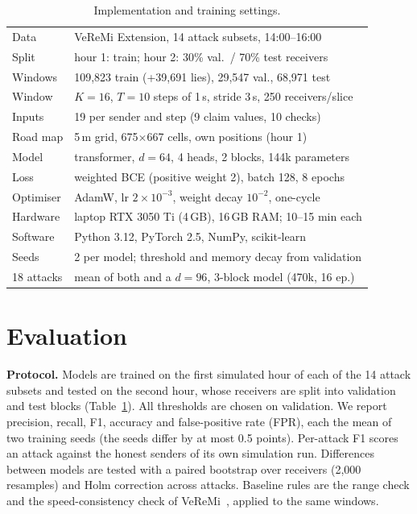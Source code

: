 \documentclass[conference]{IEEEtran}
\begin{document}
\begin{table}[t]\centering
\caption{Implementation and training settings.}\label{tab:impl}\scriptsize\setlength{\tabcolsep}{3pt}
\begin{tabular}{@{}ll@{}}\toprule
Data & VeReMi Extension, 14 attack subsets, 14:00--16:00 \\
Split & hour 1: train; hour 2: 30\% val.\ / 70\% test receivers \\
Windows & 109,823 train (+39,691 lies), 29,547 val., 68,971 test \\
Window & $K{=}16$, $T{=}10$ steps of 1\,s, stride 3\,s, 250 receivers/slice \\
Inputs & 19 per sender and step (9 claim values, 10 checks) \\
Road map & 5\,m grid, 675$\times$667 cells, own positions (hour 1) \\
Model & transformer, $d{=}64$, 4 heads, 2 blocks, 144k parameters \\
Loss & weighted BCE (positive weight 2), batch 128, 8 epochs \\
Optimiser & AdamW, lr $2{\times}10^{-3}$, weight decay $10^{-2}$, one-cycle \\
Hardware & laptop RTX 3050 Ti (4\,GB), 16\,GB RAM; 10--15 min each \\
Software & Python 3.12, PyTorch 2.5, NumPy, scikit-learn \\
Seeds & 2 per model; threshold and memory decay from validation \\
18 attacks & mean of both and a $d{=}96$, 3-block model (470k, 16 ep.) \\\bottomrule
\end{tabular}
\end{table}

\section{Evaluation}
\label{sec:eval}
\textbf{Protocol.} Models are trained on the first simulated hour of each of the 14 attack subsets and tested on the second hour, whose
receivers are split into validation and test blocks (Table~\ref{tab:impl}). All thresholds are chosen on validation. We report precision, recall, F1, accuracy and false-positive rate (FPR), each the mean of two
training seeds (the seeds differ by at most 0.5 points). Per-attack F1 scores an attack against the honest senders of its own simulation run.
Differences between models are tested with a paired bootstrap over receivers (2,000 resamples) and Holm correction across attacks. Baseline rules
are the range check and the speed-consistency check of VeReMi~\cite{vanderheijden2018}, applied to the same windows.
\end{document}
